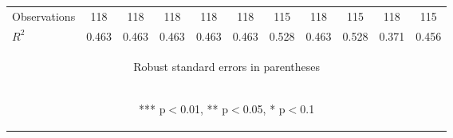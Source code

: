\begin{center}
\begin{tabular}{lcccccccccc}
Observations & 118 & 118 & 118 & 118 & 118 & 115 & 118 & 115 & 118 & 115 \\
 $R^2$ & 0.463 & 0.463 & 0.463 & 0.463 & 0.463 & 0.528 & 0.463 & 0.528 & 0.371 & 0.456 \\ \hline
\multicolumn{11}{c}{\begin{footnotesize} Robust standard errors in parentheses\end{footnotesize}} \\
\multicolumn{11}{c}{\begin{footnotesize} *** p$<$0.01, ** p$<$0.05, * p$<$0.1\end{footnotesize}} \\
\end{tabular}
\end{center}
